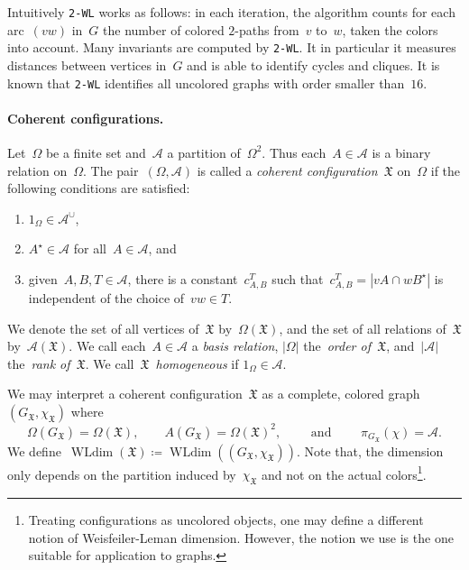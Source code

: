 \documentclass[english,a4paper]{article}
\theoremstyle{plain}
\theoremstyle{definition}
\newcommand{\abs}[1]{| #1 |}
\newcommand{\coherentConfig}{\ensuremath{\mathfrak{X}}}
\newcommand{\vertices}{\ensuremath{\Omega}}
\newcommand{\relations}{\ensuremath{\mathcal{A}}}
\newcommand{\arcs}{\ensuremath{A}}
\DeclareMathOperator*{\WLdim}{WLdim}
\newcommand{\wldim}[1]{\ensuremath{\WLdim\left(#1\right)}}
\newcommand{\wld}[1]{\texttt{#1-WL}}
\newcommand{\wltwo}{\wld{2}\xspace}
\newcommand{\coloring}{\ensuremath{\chi}}
\begin{document}
Intuitively \wltwo works as follows:
in each iteration, the algorithm counts for each arc~$(vw)$ in~$G$ the number of colored $2$-paths from~$v$ to~$w$, taken the colors into account.
Many invariants are computed by \wltwo. It in particular it measures distances between vertices in~$G$ and is able to identify cycles and cliques.
It is known that \wltwo identifies all uncolored graphs with order smaller than~$16$.



\paragraph{Coherent configurations.}
Let~$\vertices$ be a finite set and~$\relations$ a partition of~$\vertices^2$. Thus each~$A \in \relations$ is a binary relation on~$\vertices$.
The pair~$(\vertices, \relations)$ is called a \emph{coherent configuration~$\coherentConfig$} on~$\vertices$ if the following conditions are satisfied:
\begin{enumerate}[label = (CC\arabic*), leftmargin = 4em]
    \item \label{coherent-config:fibers}
    $1_\vertices \in \relations^\cup$,
    \item \label{coherent-config:symmetric}
    $A^\star \in \relations$ for all~$A \in \relations$, and
    \item \label{coherent-config:wl2}
    given~$A, B, T \in \relations$, there is a constant~$c^T_{A,B}$ such that~$c^T_{A,B} = \abs{vA \cap wB^\star}$ is independent of the choice of~$vw \in T$.
\end{enumerate}
We denote the set of all vertices of~$\coherentConfig$ by~$\vertices(\coherentConfig)$, and the set of all relations of~$\coherentConfig$ by~$\relations(\coherentConfig)$.
We call each~$\arcs \in \relations$ a \emph{basis relation}, $\abs{\vertices}$ the~\emph{order of~$\coherentConfig$}, and~$\abs{\relations}$ the~\emph{rank of~$\coherentConfig$}.
We call~$\coherentConfig$~\emph{homogeneous} if $1_\vertices \in \relations$.

We may interpret a coherent configuration~$\coherentConfig$ as a complete, colored graph~$(G_\coherentConfig,\coloring_\coherentConfig)$ where
\[
    \vertices(G_\coherentConfig) = \vertices(\coherentConfig), \qquad \arcs(G_\coherentConfig) = \vertices(\coherentConfig)^2,  \qquad   \text{ and } \qquad  \pi_{G_\coherentConfig}(\coloring) = \relations.
\]
We define~$\wldim{\coherentConfig} \coloneqq \wldim{(G_\coherentConfig,\coloring_\coherentConfig)}$. Note that, the dimension only depends on the partition induced by~$\coloring_\coherentConfig$ and not on the actual colors\footnote{Treating configurations as uncolored objects, one may define a different notion of Weisfeiler-Leman dimension. However, the notion we use is the one suitable for application to graphs.}.
\end{document}
